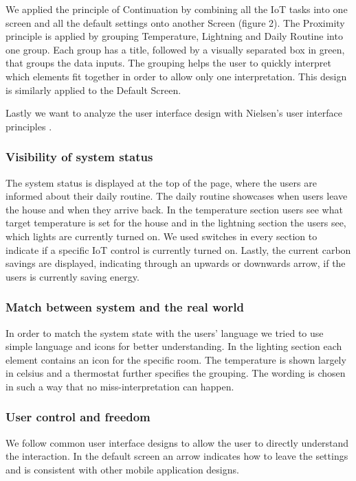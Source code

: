 \documentclass[]{interact}
\theoremstyle{plain}%
\theoremstyle{definition}
\theoremstyle{remark}
\begin{document}
We applied the principle of Continuation by combining all the IoT tasks into one screen and all the default settings onto another Screen (figure 2). The Proximity principle is applied by grouping Temperature, Lightning and Daily Routine into one group. Each group has a title, followed by a visually separated box in green, that groups the data inputs. The grouping helps the user to quickly interpret which elements fit together in order to allow only one interpretation. This design is similarly applied to the Default Screen.

Lastly we want to analyze the user interface design with Nielsen's user interface principles \citep*{nielsen_10_2020}.

\subsubsection*{Visibility of system status}

The system status is displayed at the top of the page, where the users are informed about their daily routine. The daily routine showcases when users leave the house and when they arrive back. In the temperature section users see what target temperature is set for the house and in the lightning section the users see, which lights are currently turned on. We used switches in every section to indicate if a specific IoT control is currently turned on.
Lastly, the current carbon savings are displayed, indicating through an upwards or downwards arrow, if the users is currently saving energy.

\subsubsection*{Match between system and the real world}

In order to match the system state with the users' language we tried to use simple language and icons for better understanding. In the lighting section each element contains an icon for the specific room. The temperature is shown largely in celsius and a thermostat further specifies the grouping.
The wording is chosen in such a way that no miss-interpretation can happen.


\subsubsection*{User control and freedom}

We follow common user interface designs to allow the user to directly understand the interaction. In the default screen an arrow indicates how to leave the settings and is consistent with other mobile application designs.
\end{document}
